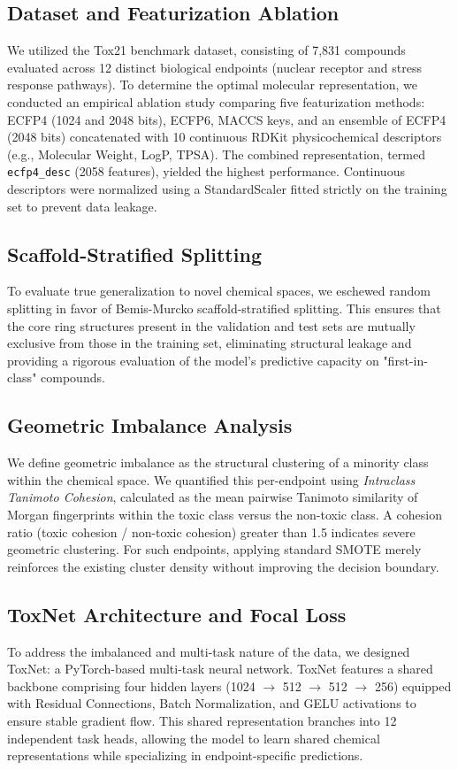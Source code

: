 \documentclass[lettersize,journal]{IEEEtran}
\begin{document}
\subsection{Dataset and Featurization Ablation}
We utilized the Tox21 benchmark dataset, consisting of 7,831 compounds evaluated across 12 distinct biological endpoints (nuclear receptor and stress response pathways). To determine the optimal molecular representation, we conducted an empirical ablation study comparing five featurization methods: ECFP4 (1024 and 2048 bits), ECFP6, MACCS keys, and an ensemble of ECFP4 (2048 bits) concatenated with 10 continuous RDKit physicochemical descriptors (e.g., Molecular Weight, LogP, TPSA). The combined representation, termed \texttt{ecfp4\_desc} (2058 features), yielded the highest performance. Continuous descriptors were normalized using a StandardScaler fitted strictly on the training set to prevent data leakage.

\subsection{Scaffold-Stratified Splitting}
To evaluate true generalization to novel chemical spaces, we eschewed random splitting in favor of Bemis-Murcko scaffold-stratified splitting. This ensures that the core ring structures present in the validation and test sets are mutually exclusive from those in the training set, eliminating structural leakage and providing a rigorous evaluation of the model's predictive capacity on "first-in-class" compounds.

\subsection{Geometric Imbalance Analysis}
We define geometric imbalance as the structural clustering of a minority class within the chemical space. We quantified this per-endpoint using \textit{Intraclass Tanimoto Cohesion}, calculated as the mean pairwise Tanimoto similarity of Morgan fingerprints within the toxic class versus the non-toxic class. A cohesion ratio (toxic cohesion / non-toxic cohesion) greater than 1.5 indicates severe geometric clustering. For such endpoints, applying standard SMOTE merely reinforces the existing cluster density without improving the decision boundary. 

\subsection{ToxNet Architecture and Focal Loss}
To address the imbalanced and multi-task nature of the data, we designed ToxNet: a PyTorch-based multi-task neural network. ToxNet features a shared backbone comprising four hidden layers (1024 $\rightarrow$ 512 $\rightarrow$ 512 $\rightarrow$ 256) equipped with Residual Connections, Batch Normalization, and GELU activations to ensure stable gradient flow. This shared representation branches into 12 independent task heads, allowing the model to learn shared chemical representations while specializing in endpoint-specific predictions.
\end{document}
